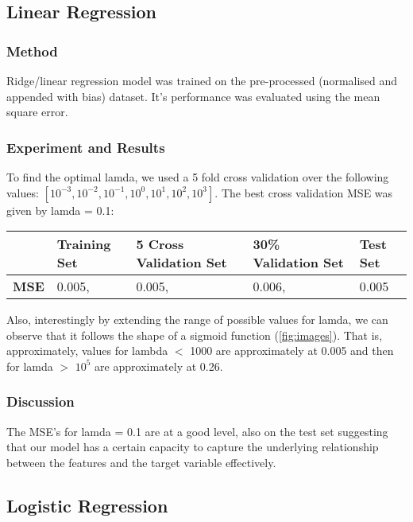 \subsection{Linear Regression}

\subsubsection{Method}
Ridge/linear regression model was trained on the pre-processed (normalised and appended with bias) dataset. It's performance was evaluated using the mean square error.

\subsubsection{Experiment and Results}
To find the optimal lamda, we used a 5 fold cross validation over the following values: $[ 10^{-3},10^{-2},10^{-1},10^{0},10^{1},10^{2},10^{3} ]$. The best cross validation MSE was given by lamda = 0.1: 
\begin{center}
  \begin{tabular}{l l l l l}
    \hline
    & \textbf{Training Set} & \textbf{5 Cross Validation Set} & \textbf{30\% Validation Set} & \textbf{Test Set}\\ 
    \hline 
    \textbf{MSE} & 0.005, & 0.005, & 0.006, & 0.005 \\
    \hline 
    \end{tabular}
    \label{tab:macro_f1_accuracy}
\end{center}

Also, interestingly by extending the range of possible values for lamda, we can observe that it follows the shape of a sigmoid function (\cref{fig:images}). That is, approximately, values for lambda $<$ 1000 are approximately at  0.005 and then for lamda $>$ $10^{5}$ are approximately at 0.26. 

\subsubsection{Discussion}
The MSE's for lamda = 0.1 are at a good level, also on the test set suggesting that our model has a certain capacity to capture the underlying relationship between the features and the target variable effectively. 


\subsection{Logistic Regression}


